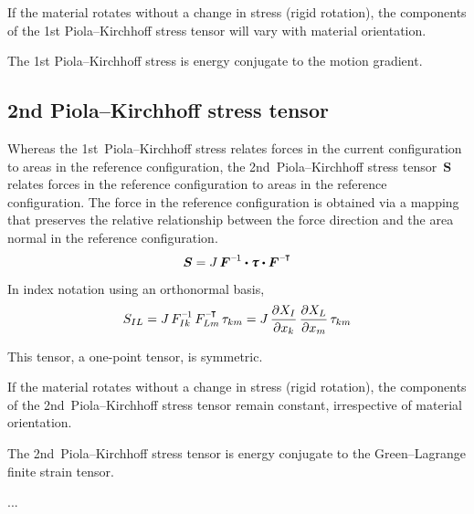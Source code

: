 {If the material rotates without a change in stress (rigid rotation), the components of the 1st Piola\hbox{--}Kirchhoff stress tensor will vary with material orientation.

The 1st Piola\hbox{--}Kirchhoff stress is energy conjugate to the motion gradient.

\subsection*{2nd Piola\hbox{--}Kirchhoff stress tensor}

Whereas the 1st~Piola\hbox{--}Kirchhoff stress relates forces in the current configuration to areas in the reference configuration, the 2nd~Piola\hbox{--}Kirchhoff stress tensor~$\bm{S}$ relates forces in the reference configuration to areas in the reference configuration. The force in the reference configuration is obtained via a mapping that preserves the relative relationship between the force direction and the area normal in the reference configuration.
\[
\bm{S} = J \, \bm{F}^{\expminusone} \dotp \cauchystress \dotp \bm{F}^{\expminusT}
\]

In index notation using an orthonormal basis,
\[
S_{IL} = J \, F_{Ik}^{\expminusone} \, F_{Lm}^{\expminusT} \, \tau_{km} =
J \, \frac{\partial X_{I}}{\partial x_{k}} \, \frac{\partial X_{L}}{\partial x_{m}} \, \tau_{km}
\]

This tensor, a one\hbox{-}point tensor, is symmetric.

If the material rotates without a change in stress (rigid rotation), the components of the 2nd~Piola\hbox{--}Kirchhoff stress tensor remain constant, irrespective of material orientation.

The 2nd~Piola\hbox{--}Kirchhoff stress tensor is energy conjugate to the Green\hbox{--}Lagrange finite strain tensor.
\par}


...



\newpage



